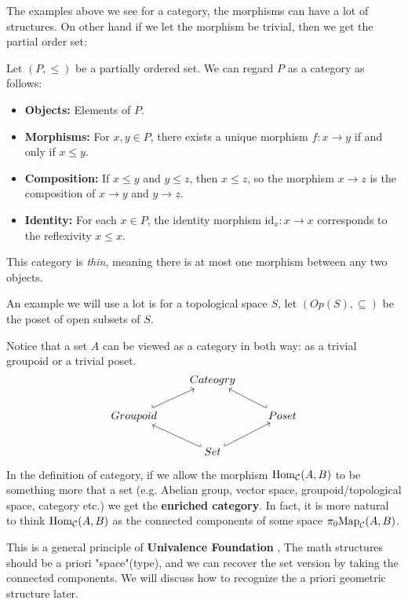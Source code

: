 The examples above we see for a category, the morphisms can have a lot of structures. On other hand if we let the morphism be trivial, then we get the partial order set:
\begin{example}[{Poset}]
  Let $(P, \leq)$ be a partially ordered set. We can regard $P$ as a category as follows:

\begin{itemize}
    \item \textbf{Objects:} Elements of $P$.
    \item \textbf{Morphisms:} For $x, y \in P$, there exists a unique morphism $f: x \to y$ if and only if $x \leq y$.
    \item \textbf{Composition:} If $x \leq y$ and $y \leq z$, then $x \leq z$, so the morphism $x \to z$ is the composition of $x \to y$ and $y \to z$.
    \item \textbf{Identity:} For each $x \in P$, the identity morphism $\mathrm{id}_x: x \to x$ corresponds to the reflexivity $x \leq x$.
\end{itemize}

This category is \emph{thin}, meaning there is at most one morphism between any two objects.

An example we will use a lot is for a topological space $S$, let $(Op(S),\subseteq)$ be the poset of open subsets of $S$.

\end{example}
Notice that a set $A$ can be viewed as a category in both way: as a trivial groupoid or a trivial poset.
\[\begin{tikzcd}[ampersand replacement=\&,cramped]
	\& Cateogry \\
	Groupoid \&\& Poset \\
	\& Set
	\arrow[hook, from=2-1, to=1-2]
	\arrow[hook', from=2-3, to=1-2]
	\arrow[hook', from=3-2, to=2-1]
	\arrow[hook, from=3-2, to=2-3]
\end{tikzcd}\]

\begin{remark}
  In the definition of category, if we allow the morphism $\mathrm{Hom}_{\mathcal{C}}(A,B)$ to be something more that a set (e.g. Abelian group, vector space, groupoid/topological space, category etc.) we get the \textbf{enriched category}. In fact, it is more natural to think $\mathrm{Hom}_{\mathcal{C}}(A,B)$ as the connected components of some space $ \pi_0\mathrm{Map}_{\mathcal{C}}(A,B)$. 

  This is a general principle of \textbf{ Univalence Foundation }, The math structures should be a priori "space"(type), and we can recover the set version by taking the connected components. We will discuss how to recognize the a priori geometric structure later.
\end{remark} 

